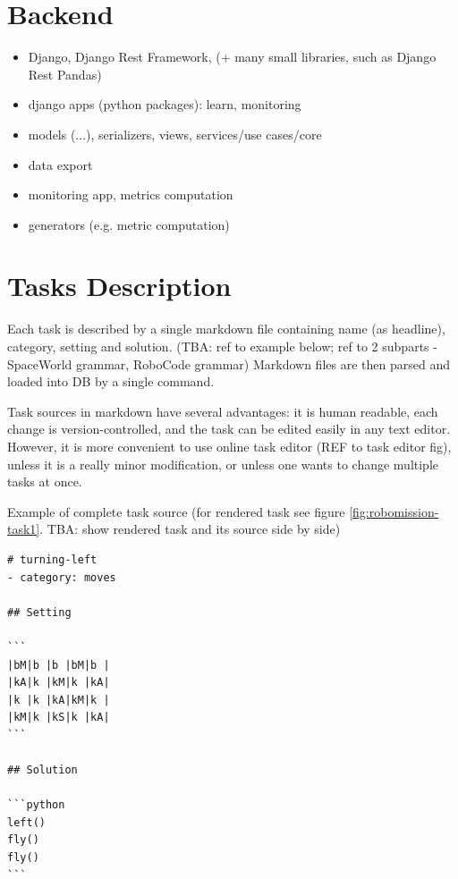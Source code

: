 \section{Backend}

\begin{itemize}
\item Django, Django Rest Framework, (+ many small libraries, such as Django Rest Pandas)
\item django apps (python packages): learn, monitoring
\item models (...), serializers, views, services/use cases/core
\item data export
\item monitoring app, metrics computation
\item generators (e.g. metric computation)
\end{itemize}


\section{Tasks Description}

Each task is described by a single markdown file
containing name (as headline), category, setting and solution.
(TBA: ref to example below; ref to 2 subparts - SpaceWorld grammar, RoboCode grammar)
Markdown files are then parsed and loaded into DB by a single command.

Task sources in markdown have several advantages:
it is human readable,
each change is version-controlled,
and the task can be edited easily in any text editor.
However, it is more convenient to use online task editor (REF to task editor fig),
unless it is a really minor modification, or unless one wants to change multiple tasks at once.



Example of complete task source (for rendered task see figure \ref{fig:robomission-task1}. TBA: show rendered task and its source side by side)

\begin{lstlisting}
# turning-left
- category: moves

## Setting

```
|bM|b |b |bM|b |
|kA|k |kM|k |kA|
|k |k |kA|kM|k |
|kM|k |kS|k |kA|
```

## Solution

```python
left()
fly()
fly()
```
\end{lstlisting}


